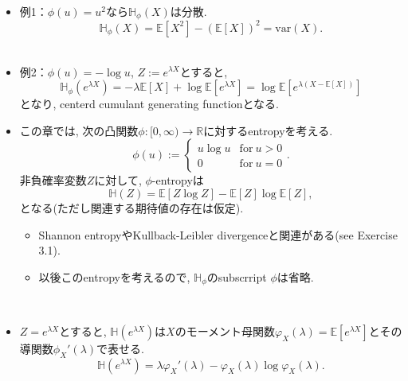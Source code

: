 \documentclass[aspectratio=169, dvipdfmx]{beamer}
\newcommand{\ex}{\mathbb{E}}
\newcommand{\var}{\mathrm{var}}
\begin{document}
\begin{frame}
\begin{itemize}
    \item 例1：$\phi(u) = u^2$なら$\mathbb{H}_\phi(X)$は分散.
        \[ \mathbb{H}_\phi(X) = \ex[X^2] - (\ex[X])^2 = \var(X).\]
    　
    \item 例2：$\phi(u) = -\log u$, $Z := e^{\lambda X}$とすると,
        \[ \mathbb{H}_\phi(e^{\lambda X})  = -\lambda \ex[X] + \log \ex[e^{\lambda X}] = \log\ex[e^{\lambda(X-\ex[X])}]\]
        となり, centerd cumulant generating functionとなる.
\end{itemize}
\end{frame}

\begin{frame}
    \begin{itemize}
        \item この章では, 次の凸関数$\phi:[0,\infty)\to\mathbb{R}$に対するentropyを考える.
        \[\phi(u) := 
            \begin{cases}
                u\log u & \mathrm{for} \ u > 0\\
                0       & \mathrm{for} \ u = 0
            \end{cases}.\tag{3.1}\label{3.1}
        \]
        非負確率変数$Z$に対して, $\phi$-entropyは
        \[ \mathbb{H}(Z) = \ex[Z\log Z] - \ex[Z]\log\ex[Z], \tag{3.2}\label{3.2}\]
        となる(ただし関連する期待値の存在は仮定). 
        \begin{itemize}
            \item Shannon entropyやKullback-Leibler divergenceと関連がある(see Exercise 3.1).
            \item 以後このentropyを考えるので, $\mathbb{H}_\phi$のsubscrript $\phi$は省略.
        \end{itemize}
        　
        \item $Z = e^{\lambda X}$とすると, $\mathbb{H}(e^{\lambda X})$は$X$のモーメント母関数$\varphi_X(\lambda)=\ex[e^{\lambda X}]$とその導関数$\phi_X'(\lambda)$で表せる.
        \[\mathbb{H}(e^{\lambda X}) = \lambda \varphi_X'(\lambda) - \varphi_X(\lambda)\log\varphi_X(\lambda). \tag{3.3}\label{3.3}\]
    \end{itemize}
\end{frame}
\end{document}
